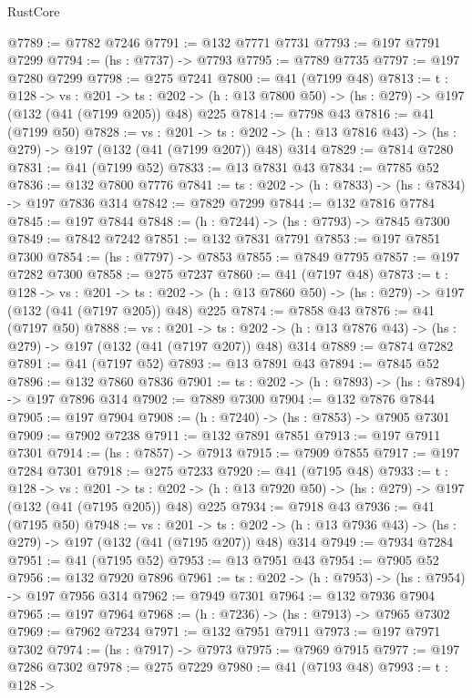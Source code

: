 \begin{lexlean}{RustCore}
\begin{coremodule}
@7789 := @7782 @7246
@7791 := @132 @7771 @7731
@7793 := @197 @7791 @7299
@7794 := (hs : @7737) -> @7793
@7795 := @7789 @7735
@7797 := @197 @7280 @7299
@7798 := @275 @7241
@7800 := @41 (@7199 @48)
@7813 := {t : @128} ->
  {vs : @201} ->
  {ts : @202} -> (h : @13 @7800 @50) -> (hs : @279) -> @197 (@132 (@41 (@7199 @205)) @48) @225
@7814 := @7798 @43
@7816 := @41 (@7199 @50)
@7828 := {vs : @201} ->
  {ts : @202} -> (h : @13 @7816 @43) -> (hs : @279) -> @197 (@132 (@41 (@7199 @207)) @48) @314
@7829 := @7814 @7280
@7831 := @41 (@7199 @52)
@7833 := @13 @7831 @43
@7834 := @7785 @52
@7836 := @132 @7800 @7776
@7841 := {ts : @202} -> (h : @7833) -> (hs : @7834) -> @197 @7836 @314
@7842 := @7829 @7299
@7844 := @132 @7816 @7784
@7845 := @197 @7844
@7848 := (h : @7244) -> (hs : @7793) -> @7845 @7300
@7849 := @7842 @7242
@7851 := @132 @7831 @7791
@7853 := @197 @7851 @7300
@7854 := (hs : @7797) -> @7853
@7855 := @7849 @7795
@7857 := @197 @7282 @7300
@7858 := @275 @7237
@7860 := @41 (@7197 @48)
@7873 := {t : @128} ->
  {vs : @201} ->
  {ts : @202} -> (h : @13 @7860 @50) -> (hs : @279) -> @197 (@132 (@41 (@7197 @205)) @48) @225
@7874 := @7858 @43
@7876 := @41 (@7197 @50)
@7888 := {vs : @201} ->
  {ts : @202} -> (h : @13 @7876 @43) -> (hs : @279) -> @197 (@132 (@41 (@7197 @207)) @48) @314
@7889 := @7874 @7282
@7891 := @41 (@7197 @52)
@7893 := @13 @7891 @43
@7894 := @7845 @52
@7896 := @132 @7860 @7836
@7901 := {ts : @202} -> (h : @7893) -> (hs : @7894) -> @197 @7896 @314
@7902 := @7889 @7300
@7904 := @132 @7876 @7844
@7905 := @197 @7904
@7908 := (h : @7240) -> (hs : @7853) -> @7905 @7301
@7909 := @7902 @7238
@7911 := @132 @7891 @7851
@7913 := @197 @7911 @7301
@7914 := (hs : @7857) -> @7913
@7915 := @7909 @7855
@7917 := @197 @7284 @7301
@7918 := @275 @7233
@7920 := @41 (@7195 @48)
@7933 := {t : @128} ->
  {vs : @201} ->
  {ts : @202} -> (h : @13 @7920 @50) -> (hs : @279) -> @197 (@132 (@41 (@7195 @205)) @48) @225
@7934 := @7918 @43
@7936 := @41 (@7195 @50)
@7948 := {vs : @201} ->
  {ts : @202} -> (h : @13 @7936 @43) -> (hs : @279) -> @197 (@132 (@41 (@7195 @207)) @48) @314
@7949 := @7934 @7284
@7951 := @41 (@7195 @52)
@7953 := @13 @7951 @43
@7954 := @7905 @52
@7956 := @132 @7920 @7896
@7961 := {ts : @202} -> (h : @7953) -> (hs : @7954) -> @197 @7956 @314
@7962 := @7949 @7301
@7964 := @132 @7936 @7904
@7965 := @197 @7964
@7968 := (h : @7236) -> (hs : @7913) -> @7965 @7302
@7969 := @7962 @7234
@7971 := @132 @7951 @7911
@7973 := @197 @7971 @7302
@7974 := (hs : @7917) -> @7973
@7975 := @7969 @7915
@7977 := @197 @7286 @7302
@7978 := @275 @7229
@7980 := @41 (@7193 @48)
@7993 := {t : @128} ->

\end{coremodule}
\end{lexlean}
